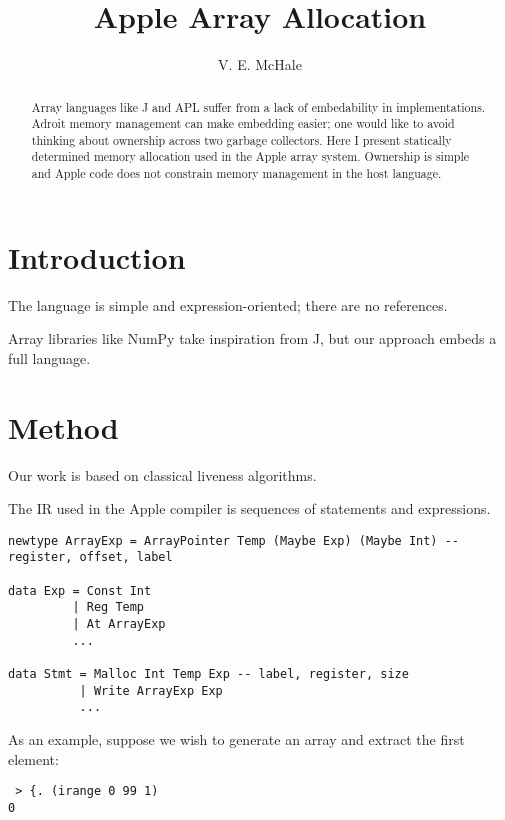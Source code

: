 \documentclass{article}
\begin{document}
\title{Apple Array Allocation}
\author{V. E. McHale}
\maketitle

\begin{abstract}
    Array languages like J and APL suffer from a lack of embedability in implementations. Adroit memory management can make embedding easier; one would like to avoid thinking about ownership across two garbage collectors. Here I present statically determined memory allocation used in the Apple array system. Ownership is simple and Apple code does not constrain memory management in the host language.
\end{abstract}

\section{Introduction}

The language is simple and expression-oriented; there are no references.

Array libraries like NumPy take inspiration from J, but our approach embeds a full language.

\section{Method}

Our work is based on classical liveness algorithms.

The IR used in the Apple compiler is sequences of statements and expressions.

\begin{verbatim}
newtype ArrayExp = ArrayPointer Temp (Maybe Exp) (Maybe Int) -- register, offset, label

data Exp = Const Int
         | Reg Temp
         | At ArrayExp
         ...

data Stmt = Malloc Int Temp Exp -- label, register, size
          | Write ArrayExp Exp
          ...
\end{verbatim}

As an example, suppose we wish to generate an array and extract the first element:

\begin{verbatim}
 > {. (irange 0 99 1)
0
\end{verbatim}
\end{document}

